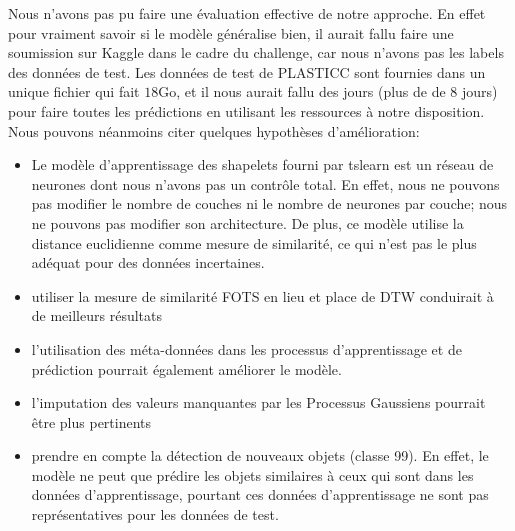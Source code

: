 Nous n'avons pas pu faire une évaluation effective de notre approche. En effet pour vraiment savoir si le modèle généralise bien, il aurait fallu faire une soumission sur Kaggle dans le cadre du challenge, car nous n'avons pas les labels des données de test. Les données de test de PLASTICC sont fournies dans un unique fichier qui fait $ 18$Go, et il nous aurait fallu des jours (plus de de 8 jours) pour faire toutes les prédictions en utilisant les ressources à notre disposition. Nous pouvons néanmoins citer quelques hypothèses d'amélioration:
\begin{itemize}
    \item Le modèle d'apprentissage des shapelets fourni par tslearn est un réseau de neurones dont nous n'avons pas un contrôle total. En effet, nous ne pouvons pas modifier le nombre de couches ni le nombre de neurones par couche; nous ne pouvons pas modifier son architecture. De plus, ce modèle utilise la distance euclidienne comme mesure de similarité, ce qui n'est pas le plus adéquat pour des données incertaines.
    \item utiliser la mesure de similarité FOTS en lieu et place de DTW conduirait à de meilleurs résultats
    \item l'utilisation des méta-données dans les processus d'apprentissage et de prédiction pourrait également améliorer le modèle.
    \item l'imputation des valeurs manquantes par les Processus Gaussiens pourrait être plus pertinents
    \item prendre en compte la détection de nouveaux objets (classe 99). En effet, le modèle ne peut que prédire les objets similaires à ceux qui sont dans les données d'apprentissage, pourtant ces données d'apprentissage ne sont pas représentatives pour les données de test.
\end{itemize}